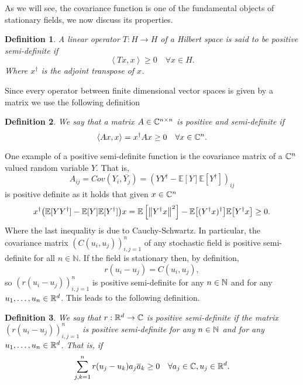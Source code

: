 \documentclass[12pt]{article}
\newtheorem{definition}{Definition}
\newcommand{\br}[1]{\left\langle#1\right\rangle}
\begin{document}
As we will see, the covariance function is one of the fundamental objects of stationary fields, we now discuss its properties.
\begin{definition}
    A linear operator $T: H\to H$ of a Hilbert space is said to be positive semi-definite if
    \begin{equation*}
        \br{Tx,x}\geq 0 \quad\forall x \in H.
    \end{equation*}
    Where $x^\dagger$ is the adjoint transpose of $x$.
\end{definition}
Since every operator between finite dimensional vector spaces is given by a matrix we use the following definition
\begin{definition}
    We say that a matrix $A \in \mathbb{C}^{n\times n}$ is positive and semi-definite if
    \begin{equation*}
        \br{Ax,x}=x^\dagger Ax\geq 0\quad\forall x \in \C^n.
    \end{equation*}
\end{definition}
One example of a positive semi-definite function is the covariance matrix of a $\mathbb{C}^n$ valued random variable  $Y$. That is, $$A_{ij}=Cov(Y_i,\overline{Y_j})=(YY^\dagger-\mathbb{E}[Y]\mathbb{E}[Y^\dagger])_{ij}$$ is positive definite as it holds that given $x\in \mathbb{C}^n$
\begin{equation*}
    x^\dagger\qty(\mathbb{E}[YY^\dagger]-\mathbb{E}[Y]\mathbb{E}[Y^\dagger])x=\mathbb{E}\left[\norm{Y^\dagger x}^2\right]-\mathbb{E}\qty[(Y^\dagger x)^\dagger]\mathbb{E}\qty[Y^\dagger x]\geq 0.
\end{equation*}
Where the last inequality is due to Cauchy-Schwartz.
In particular, the covariance matrix $(C(u_i,u_j))_{i,j=1}^n$ of any stochastic field is positive semi-definite for all $n\in\mathbb{N}$. If the field is stationary then, by definition,
$$r(u_i-u_j)=C(u_i,u_j),$$
so $(r(u_i-u_j))_{i,j=1}^n$ is positive semi-definite for any  $n\in\mathbb{N}$ and for any $u_1,\ldots,u_n \in {\mathbb R}^d$.
This leads to the following definition.
\begin{definition}
    We say that $r:{\mathbb R}^d\to \mathbb{C}$ is positive semi-definite if the matrix  $(r(u_i-u_j))_{i,j=1}^n$ is positive semi-definite for any  $n\in\mathbb{N}$ and for any $u_1,\ldots,u_n \in {\mathbb R}^d$. That is, if
    \begin{equation*}
        \sum_{j,k=1}^{n} r(u_j-u_k)a_j\overline{a}_k\geq 0 \quad\forall a_j \in \mathbb{C}, u_j\in {\mathbb R}^d.
    \end{equation*}
\end{definition}
\end{document}
